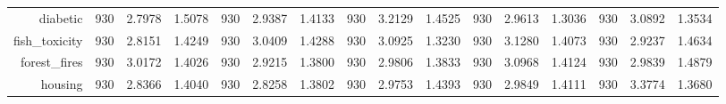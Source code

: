\begin{table}[htbp]
{\begin{tabular}{rccccccccccccccc}
			diabetic                            & 930                                     & \cellcolor[rgb]{ .776,  .937,  .808}\textcolor[rgb]{ 0,  .38,  0}{2.7978}          & 1.5078          & 930                             & 2.9387                                                                    & 1.4133          & 930                             & 3.2129          & 1.4525          & 930                             & 2.9613                                                                    & 1.3036          & 930                             & 3.0892                                                                    & 1.3534          \\
			fish\_toxicity                      & 930                                     & \cellcolor[rgb]{ .776,  .937,  .808}\textcolor[rgb]{ 0,  .38,  0}{2.8151}          & 1.4249          & 930                             & 3.0409                                                                    & 1.4288          & 930                             & 3.0925          & 1.3230          & 930                             & 3.1280                                                                    & 1.4073          & 930                             & 2.9237                                                                    & 1.4634          \\
			forest\_fires                       & 930                                     & 3.0172                                                                             & 1.4026          & 930                             & \cellcolor[rgb]{ .776,  .937,  .808}\textcolor[rgb]{ 0,  .38,  0}{2.9215} & 1.3800          & 930                             & 2.9806          & 1.3833          & 930                             & 3.0968                                                                    & 1.4124          & 930                             & 2.9839                                                                    & 1.4879          \\
			housing                             & 930                                     & 2.8366                                                                             & 1.4040          & 930                             & \cellcolor[rgb]{ .776,  .937,  .808}\textcolor[rgb]{ 0,  .38,  0}{2.8258} & 1.3802          & 930                             & 2.9753          & 1.4393          & 930                             & 2.9849                                                                    & 1.4111          & 930                             & 3.3774                                                                    & 1.3680          \\

\end{tabular}}
\end{table}
